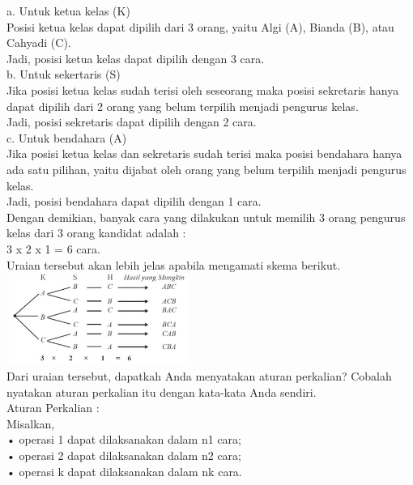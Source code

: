 \documentclass[11pt,fleqn]{book} %
\begin{document}
a. Untuk ketua kelas (K)\\
 Posisi ketua kelas dapat dipilih dari 3 orang, yaitu Algi  (A), Bianda (B), atau Cahyadi (C).\\

 Jadi, posisi ketua kelas dapat dipilih dengan 3 cara.\\
 
b. Untuk sekertaris (S)\\
 Jika posisi ketua kelas sudah terisi oleh seseorang maka  posisi sekretaris hanya dapat dipilih dari 2 orang yang belum terpilih menjadi pengurus kelas.\\ 

 Jadi, posisi sekretaris dapat dipilih dengan 2 cara.\\
 
c. Untuk bendahara (A)\\
Jika posisi ketua kelas dan sekretaris sudah terisi maka posisi bendahara hanya ada satu pilihan, yaitu dijabat oleh orang yang belum terpilih menjadi pengurus kelas.\\

Jadi, posisi bendahara dapat dipilih dengan 1 cara.\\

Dengan demikian, banyak cara yang dilakukan untuk memilih 3 orang pengurus kelas dari 3 orang kandidat adalah :\\

3 x 2 x 1 = 6 cara.\\

Uraian tersebut akan lebih jelas apabila mengamati skema berikut.\\


\includegraphics[width = 6cm, height= 3cm]{Pictures/gen2.png}\\

Dari uraian tersebut, dapatkah Anda menyatakan aturan perkalian? Cobalah nyatakan aturan perkalian itu dengan kata-kata Anda sendiri.\\

Aturan Perkalian :\\
Misalkan,\\
• operasi 1 dapat dilaksanakan dalam n1 cara;\\
• operasi 2 dapat dilaksanakan dalam n2 cara;\\
• operasi k dapat dilaksanakan dalam nk cara.\\
\end{document}
